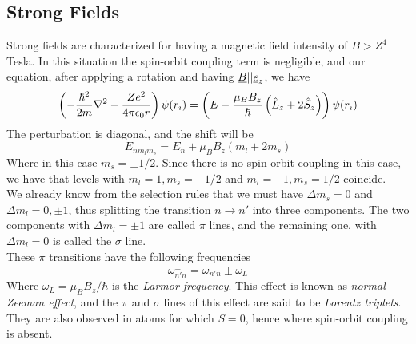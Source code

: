 \documentclass[../qm.tex]{subfiles}
\begin{document}
	\subsection{Strong Fields}
	Strong fields are characterized for having a magnetic field intensity of $B>Z^4$ Tesla. In this situation the spin-orbit coupling term is negligible, and our equation, after applying a rotation and having $\underline{B}||\underline{e}_{z}$, we have
	\begin{equation}
		\left( -\frac{\hbar^2}{2m}\nabla^2-\frac{Ze^2}{4\pi\epsilon_0r} \right)\psi(r_i)=\left( E-\frac{\mu_BB_z}{\hbar}\left( \hat{L}_z+2\hat{S}_z \right) \right)\psi(r_i)
		\label{eq:strongfieldham}
	\end{equation}
	The perturbation is diagonal, and the shift will be
	\begin{equation}
		E_{nm_lm_s}=E_n+\mu_BB_z(m_l+2m_s)
		\label{eq:energyshiftmagfield}
	\end{equation}
	Where in this case $m_s=\pm1/2$. Since there is no spin orbit coupling in this case, we have that levels with $m_l=1,m_s=-1/2$ and $m_l=-1,m_s=1/2$ coincide.\\
	We already know from the selection rules that we must have $\Delta m_s=0$ and $\Delta m_l=0,\pm1$, thus splitting the transition $n\to n'$ into three components. The two components with $\Delta m_l=\pm1$ are called $\pi$ lines, and the remaining one, with $\Delta m_l=0$ is called the $\sigma$ line.\\
	These $\pi$ transitions have the following frequencies
	\begin{equation}
		\omega^{\pm}_{n'n}=\omega_{n'n}\pm\omega_L
		\label{eq:pitranslines}
	\end{equation}
	Where $\omega_L=\mu_BB_z/\hbar$ is the \textit{Larmor frequency}. This effect is known as \textit{normal Zeeman effect}, and the $\pi$ and $\sigma$ lines of this effect are said to be \textit{Lorentz triplets}. They are also observed in atoms for which $S=0$, hence where spin-orbit coupling is absent.
\end{document}
